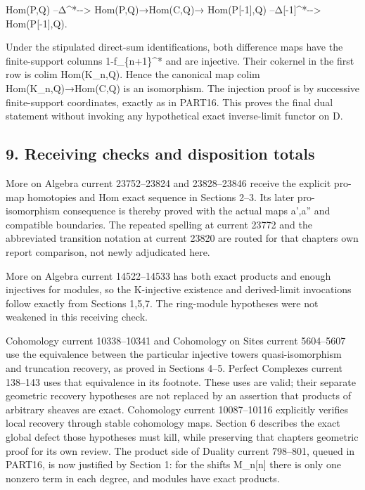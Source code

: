 Hom(P,\allowbreak{}Q)\allowbreak{} --Δ\textasciicircum{}*-\allowbreak{}-> Hom(P,\allowbreak{}Q)\allowbreak{}\allowbreak{}→Hom(C,\allowbreak{}Q)\allowbreak{}\allowbreak{}→ Hom(P[-1]\allowbreak{},\allowbreak{}Q)\allowbreak{} --Δ[-1]\allowbreak{}\textasciicircum{}*-\allowbreak{}-> Hom(P[-1]\allowbreak{},\allowbreak{}Q)\allowbreak{}.

Under the stipulated direct-sum identifications,\allowbreak{} both difference maps have the finite-support columns 1-f\_\allowbreak{}\{n\allowbreak{}+1\}\textasciicircum{}* and are injective. Their cokernel in the first row is colim Hom(K\_\allowbreak{}n,\allowbreak{}Q)\allowbreak{}. Hence the canonical map colim Hom(K\_\allowbreak{}n,\allowbreak{}Q)\allowbreak{}\allowbreak{}→Hom(C,\allowbreak{}Q)\allowbreak{} is an isomorphism. The injection proof is by successive finite-support coordinates,\allowbreak{} exactly as in PART16. This proves the final dual statement without invoking any hypothetical exact inverse-limit functor on D.

\subsection{9. Receiving checks and disposition totals}\label{proofs-10435-10686-receiving-checks-and-disposition-totals}

More on Algebra current 23752–\allowbreak{}23824 and 23828–\allowbreak{}23846 receive the explicit pro-map homotopies and Hom exact sequence in Sections 2–\allowbreak{}3. Its later pro-isomorphism consequence is thereby proved with the actual maps a',\allowbreak{}a'' and compatible boundaries. The repeated spelling at current 23772 and the abbreviated transition notation at current 23820 are routed for that chapter\textquotesingle s own report comparison,\allowbreak{} not newly adjudicated here.

More on Algebra current 14522–\allowbreak{}14533 has both exact products and enough injectives for modules,\allowbreak{} so the K-injective existence and derived-limit invocations follow exactly from Sections 1,\allowbreak{}5,\allowbreak{}7. The ring-module hypotheses were not weakened in this receiving check.

Cohomology current 10338–\allowbreak{}10341 and Cohomology on Sites current 5604–\allowbreak{}5607 use the equivalence between the particular injective tower\textquotesingle s quasi-isomorphism and truncation recovery,\allowbreak{} as proved in Sections 4–\allowbreak{}5. Perfect Complexes current 138–\allowbreak{}143 uses that equivalence in its footnote. These uses are valid; their separate geometric recovery hypotheses are not replaced by an assertion that products of arbitrary sheaves are exact. Cohomology current 10087–\allowbreak{}10116 explicitly verifies local recovery through stable cohomology maps. Section 6 describes the exact global defect those hypotheses must kill,\allowbreak{} while preserving that chapter\textquotesingle s geometric proof for its own review. The product side of Duality current 798–\allowbreak{}801,\allowbreak{} queued in PART16,\allowbreak{} is now justified by Section 1:\allowbreak{} for the shifts M\_\allowbreak{}n[n]\allowbreak{} there is only one nonzero term in each degree,\allowbreak{} and modules have exact products.

